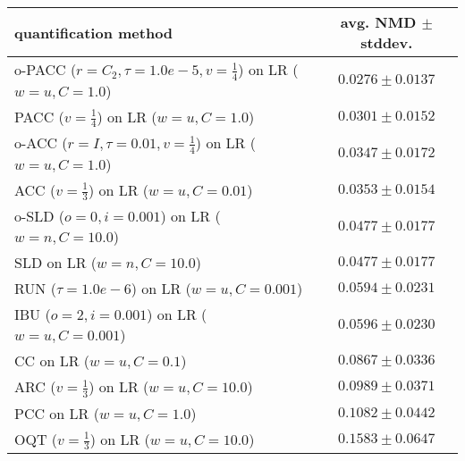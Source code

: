 \begin{tabular}{lc}
  \toprule
  quantification method & avg. NMD $\pm$ stddev. \\
  \midrule
  o-PACC ($r=C_2, \tau=1.0e-5, v=\frac{1}{4}$) on LR ($w=u, C=1.0$) & $\mathbf{0.0276 \pm 0.0137}$ \\
  PACC ($v=\frac{1}{4}$) on LR ($w=u, C=1.0$) & $0.0301 \pm 0.0152$ \\
  o-ACC ($r=I, \tau=0.01, v=\frac{1}{4}$) on LR ($w=u, C=1.0$) & $0.0347 \pm 0.0172$ \\
  ACC ($v=\frac{1}{3}$) on LR ($w=u, C=0.01$) & $0.0353 \pm 0.0154$ \\
  o-SLD ($o=0, i=0.001$) on LR ($w=n, C=10.0$) & $0.0477 \pm 0.0177$ \\
  SLD on LR ($w=n, C=10.0$) & $0.0477 \pm 0.0177$ \\
  RUN ($\tau=1.0e-6$) on LR ($w=u, C=0.001$) & $0.0594 \pm 0.0231$ \\
  IBU ($o=2, i=0.001$) on LR ($w=u, C=0.001$) & $0.0596 \pm 0.0230$ \\
  CC on LR ($w=u, C=0.1$) & $0.0867 \pm 0.0336$ \\
  ARC ($v=\frac{1}{3}$) on LR ($w=u, C=10.0$) & $0.0989 \pm 0.0371$ \\
  PCC on LR ($w=u, C=1.0$) & $0.1082 \pm 0.0442$ \\
  OQT ($v=\frac{1}{3}$) on LR ($w=u, C=10.0$) & $0.1583 \pm 0.0647$ \\
  \bottomrule
\end{tabular}
